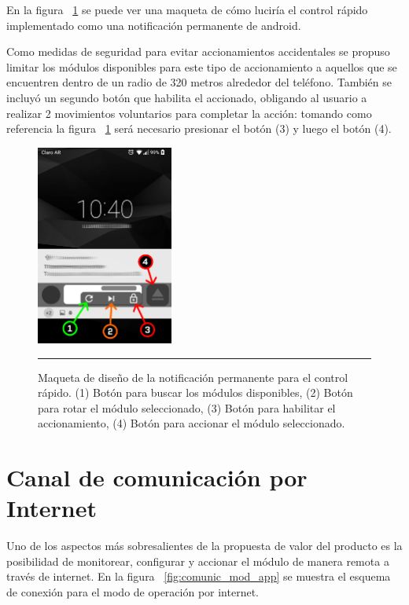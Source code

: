 En la figura ~\ref{fig:notif_design} se puede ver una maqueta de cómo luciría el control rápido implementado como una notificación permanente de android.

Como medidas de seguridad para evitar accionamientos accidentales se propuso limitar los módulos
disponibles para este tipo de accionamiento a aquellos que se encuentren dentro de un radio de 320 metros alrededor del teléfono. También se incluyó un segundo botón que habilita el accionado, obligando al usuario a realizar 2 movimientos voluntarios para completar la acción: tomando como referencia la figura ~\ref{fig:notif_design} será necesario presionar el botón (3) y luego el botón (4).


\begin{figure}[htbp]
	\centering
	\includegraphics[width=0.4\textwidth]{Figures/iter3/module_notif.png}
	\rule{35em}{1pt}
	\caption[Wireframe Control Rápido]{Maqueta de diseño de la notificación permanente para el control rápido. (1) Botón para buscar los módulos disponibles, (2) Botón para rotar el módulo seleccionado, (3) Botón para habilitar el accionamiento, (4) Botón para accionar el módulo seleccionado.}
	\label{fig:notif_design}
\end{figure}

\section{Canal de comunicación por Internet}
Uno de los aspectos más sobresalientes de la propuesta de valor del producto es la posibilidad
de monitorear, configurar y accionar el módulo de manera remota a través de internet.
En la figura ~\ref{fig:comunic_mod_app} se muestra el esquema de conexión para el modo de operación por internet.
